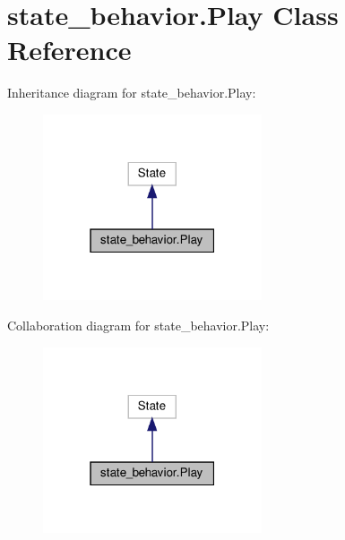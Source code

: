 \hypertarget{classstate__behavior_1_1Play}{}\section{state\+\_\+behavior.\+Play Class Reference}
\label{classstate__behavior_1_1Play}


Inheritance diagram for state\+\_\+behavior.\+Play\+:\nopagebreak
\begin{figure}[H]
\begin{center}
\leavevmode
\includegraphics[width=183pt]{classstate__behavior_1_1Play__inherit__graph}
\end{center}
\end{figure}


Collaboration diagram for state\+\_\+behavior.\+Play\+:\nopagebreak
\begin{figure}[H]
\begin{center}
\leavevmode
\includegraphics[width=183pt]{classstate__behavior_1_1Play__coll__graph}
\end{center}
\end{figure}
